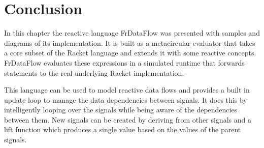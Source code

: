 \section{Conclusion}

In this chapter the reactive language FrDataFlow was presented with samples and diagrams of its implementation.
It is built as a metacircular evaluator that takes a core subset of the Racket language and extends it with some reactive concepts. FrDataFlow evaluates these expressions in a simulated runtime that forwards statements to the real underlying Racket implementation. 

This language can be used to model reactive data flows and provides a built in update loop to manage the data dependencies between signals. It does this by intelligently looping over the signals while being aware of the dependencies between them. New signals can be created by deriving from other signals and a lift function which produces a single value based on the values of the parent signals.